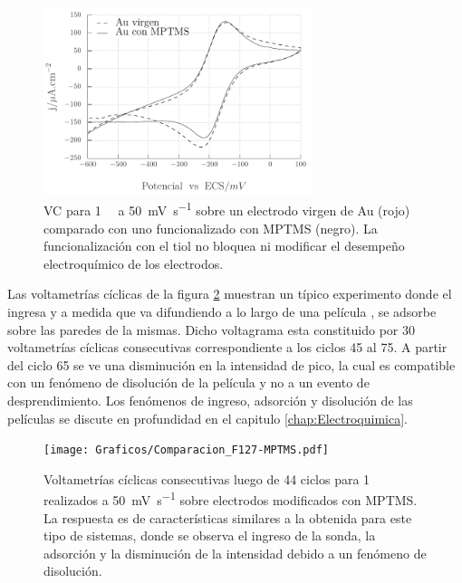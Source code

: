 					\begin{figure}[!ht]
							\begin{center}
							\includegraphics[width=0.70\textwidth]{Graficos/Comparacion_Au-MPTMS.pdf}
							\caption[Comparación de electrodos con y sin MPTMS]{VC para \aminorutenio\space \SI{1}{\milli\Molar} a \SI{50}{\milli\volt\per\second} sobre un electrodo virgen de Au (rojo) comparado con uno funcionalizado con MPTMS (negro). La funcionalización con el tiol no bloquea ni modificar el desempeño electroquímico de los electrodos.}
							\label{fig:comparaciones_MPTMS-A}
							\end{center}
							\end{figure}

             Las voltametrías cíclicas de la figura \ref{fig:comparaciones_MPTMS-B} muestran un típico experimento donde el \aminorutenio\space ingresa y a medida que va difundiendo a lo largo de una película \pdmF, se adsorbe sobre las paredes de la mismas. Dicho voltagrama esta constituido por 30 voltametrías cíclicas consecutivas correspondiente a los ciclos 45 al 75. A partir del ciclo 65 se ve una disminución en la intensidad de pico, la cual es compatible con un fenómeno de disolución de la película y no a un evento de desprendimiento. Los fenómenos de ingreso, adsorción y disolución de las películas se discute en profundidad en el capitulo \ref{chap:Electroquimica}.
       	
					\begin{figure}[!ht]
							\begin{center}
				 	   	    \texttt{[image: Graficos/Comparacion\_F127-MPTMS.pdf]}
				       		\caption[Comparación de superficies con y sin MPTMS.]{Voltametrías cíclicas consecutivas luego de 44 ciclos para \aminorutenio\space \SI{1}{\milli\Molar} realizados a \SI{50}{\milli\volt.\second^{-1}} sobre electrodos modificados con MPTMS. La respuesta es de características similares a la obtenida para este tipo de sistemas, donde se observa el ingreso de la sonda, la adsorción y la disminución de la intensidad debido a un fenómeno de disolución.}
						 \label{fig:comparaciones_MPTMS-B}	
					    \end{center}
					    \end{figure}
			
